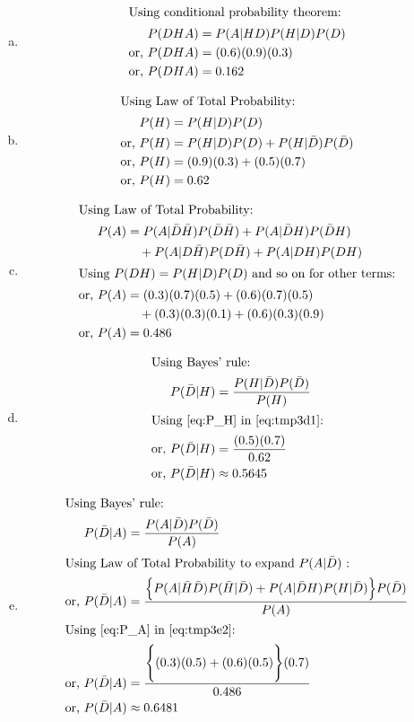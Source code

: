 \begin{enumerate}[a.]
	\item
		\begin{align}
			\intertext{Using conditional probability theorem:}
			P(DHA) &= P(A|HD)P(H|D)P(D) \nonumber\\
			\text{or, } P(DHA) &= (0.6)(0.9)(0.3) \nonumber\\
			\text{or, } P(DHA) &= 0.162 \label{eq:P_DHA}
		\end{align}
	\item
		\begin{align}
			\intertext{Using Law of Total Probability:}
			P(H) &= P(H|D)P(D) \nonumber\\
			\text{or, } P(H) &= P(H|D)P(D) + P(H|\bar{D})P(\bar{D}) \nonumber\\
			\text{or, } P(H) &= (0.9)(0.3) + (0.5)(0.7) \nonumber\\
			\text{or, } P(H) &= 0.62 \label{eq:P_H}
		\end{align}
	\item
		\begin{align}
			\intertext{Using Law of Total Probability:}
			P(A) &= P(A|\bar{D}\bar{H})P(\bar{D}\bar{H}) + P(A|\bar{D}H)P(\bar{D}H) \nonumber\\
			{} &\quad+ P(A|D\bar{H})P(D\bar{H}) + P(A|DH)P(DH) \nonumber\\
			\intertext{Using  $P(DH) = P(H|D)P(D)$ and so on for other terms:}
			\orr P(A) &= (0.3)(0.7)(0.5) + (0.6)(0.7)(0.5) \nonumber\\
			{} &\quad+ (0.3)(0.3)(0.1) + (0.6)(0.3)(0.9) \nonumber\\
			\orr P(A) &= 0.486 \label{eq:P_A}	
		\end{align}
	\item
		\begin{align}
			\intertext{Using Bayes' rule:}
			P(\bar{D}|H) &= \frac{P(H|\bar{D})P(\bar{D})}{P(H)} \label{eq:tmp3d1}\\
			\intertext{Using \cref{eq:P_H} in \cref{eq:tmp3d1}:}
			\orr P(\bar{D}|H) &= \frac{(0.5)(0.7)}{0.62} \nonumber\\
			\orr P(\bar{D}|H) &\approx 0.5645 \label{eq:P_NOTDGivenH}
		\end{align}
	\item 
		\begin{align}
			\intertext{Using Bayes' rule:}
			P(\bar{D}|A) &= \frac{P(A|\bar{D})P(\bar{D})}{P(A)} \label{eq:tmp3e1}\\
			\intertext{Using Law of Total Probability to expand $P(A|\bar{D})$ :}
			\orr P(\bar{D}|A) &= \frac{\Big\{P(A|\bar{H}\bar{D})P(\bar{H}|\bar{D}) + P(A|\bar{D}H)P(H|\bar{D})\Big\}P(\bar{D})}{P(A)} \label{eq:tmp3e2}\\
			\intertext{Using \cref{eq:P_A} in \cref{eq:tmp3e2}:}
			\orr P(\bar{D}|A) &= \frac{\Biggl\{(0.3)(0.5) + (0.6)(0.5)\Biggr\}(0.7)}{0.486} \nonumber\\
			\orr P(\bar{D}|A) &\approx 0.6481 \label{eq:P_NOTDGivenA}
		\end{align}
\end{enumerate}